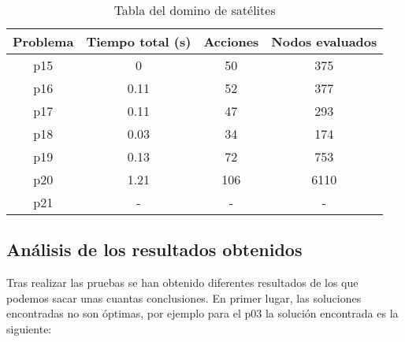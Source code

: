 \documentclass{article}
\begin{document}
\begin{table}[h]
    \centering
    \begin{tabular}{|c|c|c|c|}
    \hline
    \textbf{Problema} & \textbf{Tiempo total (s)} & \textbf{Acciones} & \textbf{Nodos evaluados} \\ \hline
    p15               & 0                          & 50                 & 375                        \\ \hline
    p16               & 0.11                       & 52                 & 377                        \\ \hline
    p17               & 0.11                       & 47                 & 293                        \\ \hline
    p18               & 0.03                       & 34                 & 174                        \\ \hline
    p19               & 0.13                       & 72                 & 753                        \\ \hline
    p20               & 1.21                       & 106                & 6110                       \\ \hline
    p21               & -                   & -                  & -                          \\ \hline
    \end{tabular}
    \caption{Tabla del domino de satélites }
    \label{tabla:problemas}
    \end{table}

    \newpage 

\subsection{Análisis de los resultados obtenidos}
Tras realizar las pruebas se han obtenido diferentes resultados de los que podemos sacar unas cuantas conclusiones. En primer lugar, las soluciones encontradas no son óptimas, por ejemplo para el p03 la solución encontrada es la siguiente:
\end{document}
